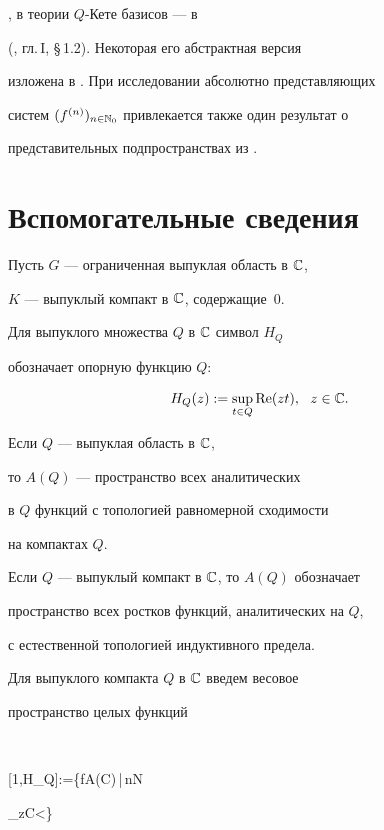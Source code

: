 \cite{IZVKOR}, в теории $Q$-Кете базисов --- в


(\cite{BRAT}, гл.\,I, \S\,1.2). Некоторая его абстрактная версия


изложена в \cite{MEL3}. При исследовании абсолютно представляющих


систем $(f^{(n)})_{n\in\Bbb N_0}$ привлекается также один результат о


представительных подпространствах из \cite{MEL1}.








\section{Вспомогательные сведения}





Пусть $G$ --- ограниченная выпуклая область в $\Bbb C$,


$K$ --- выпуклый компакт в $\Bbb C$, содержащие~$0$.


Для выпуклого множества $Q$ в $\Bbb C$ символ $H_Q$


обозначает опорную функцию $Q$:


$$


H_Q(z):=\sup\limits_{t\in Q}\re(zt),\ \ z\in\Bbb C.


$$





Если $Q$ --- выпуклая область в $\Bbb C$,


то $A(Q)$ --- пространство всех аналитических


в $Q$ функций с топологией равномерной сходимости


на компактах $Q$.


Если $Q$ --- выпуклый компакт в $\Bbb C$, то $A(Q)$ обозначает


пространство всех ростков функций, аналитических на $Q$,


с естественной топологией индуктивного предела.





Для выпуклого компакта $Q$ в $\Bbb C$ введем весовое


пространство целых функций


$$


[1,H_Q]:=\bigg\{f\in A(\Bbb C)\,\Big|\,\forall n\in\Bbb N\ 


\sup\limits_{z\in\Bbb C}<\infty\bigg\}


